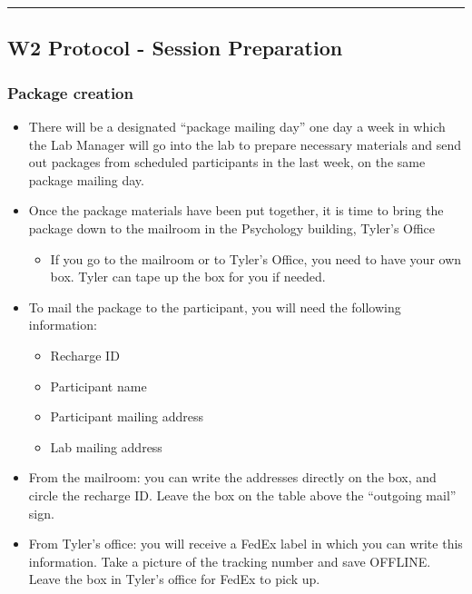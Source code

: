 \documentclass[]{book}
\providecommand{\tightlist}{%
  \setlength{\itemsep}{0pt}\setlength{\parskip}{0pt}}
\begin{document}
\begin{center}\rule{0.5\linewidth}{0.5pt}\end{center}

\hypertarget{w2-protocol---session-preparation}{%
\subsection{W2 Protocol - Session Preparation}\label{w2-protocol---session-preparation}}

\hypertarget{package-creation-1}{%
\subsubsection{Package creation}\label{package-creation-1}}

\begin{itemize}
\tightlist
\item
  There will be a designated ``package mailing day'' one day a week in which the Lab Manager will go into the lab to prepare necessary materials and send out packages from scheduled participants in the last week, on the same package mailing day.
\item
  Once the package materials have been put together, it is time to bring the package down to the mailroom in the Psychology building, Tyler's Office

  \begin{itemize}
  \tightlist
  \item
    If you go to the mailroom or to Tyler's Office, you need to have your own box. Tyler can tape up the box for you if needed.
  \end{itemize}
\item
  To mail the package to the participant, you will need the following information:

  \begin{itemize}
  \tightlist
  \item
    Recharge ID
  \item
    Participant name
  \item
    Participant mailing address
  \item
    Lab mailing address
  \end{itemize}
\item
  From the mailroom: you can write the addresses directly on the box, and circle the recharge ID. Leave the box on the table above the ``outgoing mail'' sign.\\
\item
  From Tyler's office: you will receive a FedEx label in which you can write this information. Take a picture of the tracking number and save OFFLINE. Leave the box in Tyler's office for FedEx to pick up.
\end{itemize}
\end{document}
